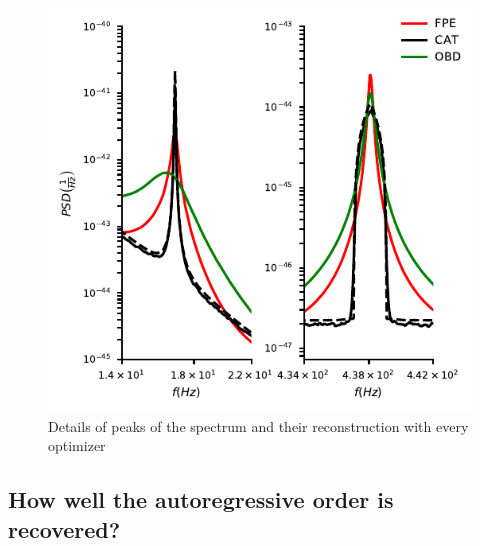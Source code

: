 \documentclass[twocolumn,showpacs,preprintnumbers,nofootinbib,prd,
superscriptaddress,10pt]{revtex4-1}
\begin{document}
\begin{figure}[t]
        \includegraphics[width = \linewidth]{Images/optimisers_comparison/ligo/compare_estimates_peaks.pdf}
        \caption{Details of peaks of the spectrum and their reconstruction with every optimizer}
        \label{fig:ligoPeaks}
\end{figure}

\subsection{How well the autoregressive order is recovered?}
\end{document}
